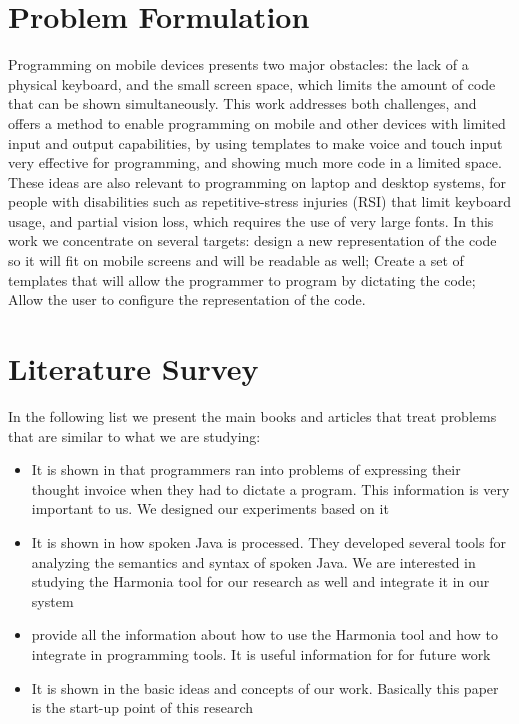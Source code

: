 \section{Problem Formulation}
Programming on mobile devices presents two major obstacles: the lack of a physical keyboard, and the small screen space, which limits the amount of code that can be shown simultaneously. This work addresses both challenges, and offers a method to enable programming on mobile and other devices with limited input and output capabilities, by using templates to make voice and touch input very effective for programming, and showing much more code in a limited space. These ideas are also relevant to programming on laptop and desktop systems, for people with disabilities such as repetitive-stress injuries (RSI) that limit keyboard usage, and partial vision loss, which requires the use of very large fonts. In this work we concentrate on several targets: design a new representation of the code so it will fit on mobile screens and will be readable as well; Create a set of templates that will allow the programmer to program by dictating the code; Allow the user to configure the representation of the code.

\section{Literature Survey}

In the following list we present the main books and articles that treat problems that are similar to what we are studying:
\begin{itemize}
	\item It is shown in \citet[Chap. 2]{andrew11} that programmers ran into problems of expressing their thought invoice when they had to dictate a program. This information is very important to us. We designed our experiments based on it
	\item It is shown in \citet[Chap. 3]{andrew11} how spoken Java is processed. They developed several tools for analyzing the semantics and syntax of spoken Java. We are interested in studying the Harmonia tool for our research as well and integrate it in our system
	\item \citet{harmonia} provide all the information about how to use the Harmonia tool and how to integrate in programming tools. It is useful information for for future work
	\item It is shown in \citet[Programming By Voice and Touch]{yishai13} the basic ideas and concepts of our work. Basically this paper is the start-up point of this research
\end{itemize}


